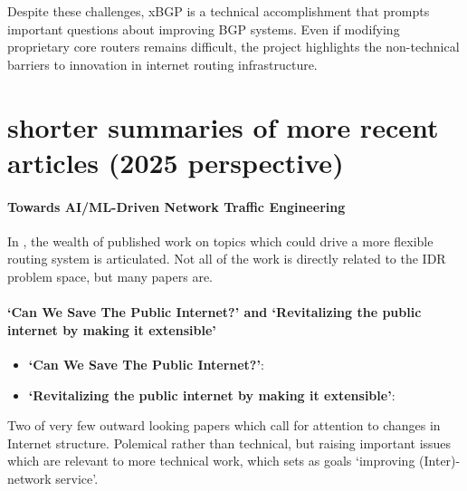 Despite these challenges, xBGP is a technical accomplishment that prompts important questions about improving BGP systems. Even if modifying proprietary core routers remains difficult, the project highlights the non-technical barriers to innovation in internet routing infrastructure.

\section {shorter summaries of more recent articles (2025 perspective)}



  
\paragraph{Towards AI/ML-Driven Network Traffic Engineering}
In \cite{alam2024}, the wealth of published work on topics which could drive a more flexible routing system is articulated.  Not all of the work is directly related to the IDR problem space, but many papers are. 

\paragraph{`Can We Save The Public Internet?' and `Revitalizing the public internet by making it extensible'}

\begin{itemize}
    \item \textbf{`Can We Save The Public Internet?'}: 
    \item \textbf{`Revitalizing the public internet by making it extensible'}: 
\end{itemize}

Two of very few outward looking papers which call for attention to changes in Internet structure.  Polemical rather than technical, but raising important issues which are relevant to more technical work, which sets as goals `improving (Inter)-network service'. 




